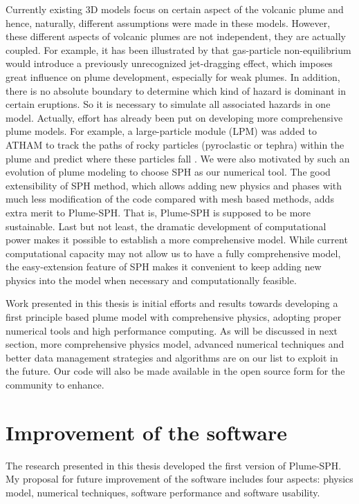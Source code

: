 Currently existing 3D models focus on certain aspect of the volcanic plume and hence, naturally, different assumptions were made in these models. However, these different aspects of volcanic plumes are not independent, they are actually coupled. For example, it has been illustrated by \cite{cerminara2016large} that gas-particle non-equilibrium would introduce a previously unrecognized jet-dragging effect, which imposes great influence on plume development, especially for weak plumes. In addition, there is no absolute boundary to determine which kind of hazard is dominant in certain eruptions. So it is necessary to simulate all associated hazards in one model. Actually, effort has already been put on developing more comprehensive plume models. For example, a large-particle module (LPM) was added to ATHAM to track the paths of rocky particles (pyroclastic or tephra) within the plume and predict where these particles fall \citep{kobs2009modeling}. We were also motivated by such an evolution of plume modeling to choose SPH as our numerical tool. The good extensibility of SPH method, which allows adding new physics and phases with much less modification of the code compared with mesh based methods, adds extra merit to Plume-SPH. That is, Plume-SPH is supposed to be more sustainable.
Last but not least, the dramatic development of computational power makes it possible to establish a more comprehensive model. While current computational capacity may not allow us to have a fully comprehensive model, the easy-extension feature of SPH makes it convenient to keep adding new physics into the model when necessary and computationally feasible. 

Work presented in this thesis is initial efforts and results towards developing a first principle based plume model with comprehensive physics, adopting proper numerical tools and high performance computing. As will be discussed in next section, more comprehensive physics model, advanced numerical techniques and better data management strategies and algorithms are on our list to exploit in the future. Our code will also be made available in the open source form for the community to enhance.

\section{Improvement of the software}
The research presented in this thesis developed the first version of Plume-SPH.
My proposal for future improvement of the software includes four aspects: physics model, numerical techniques, software performance and software usability.


